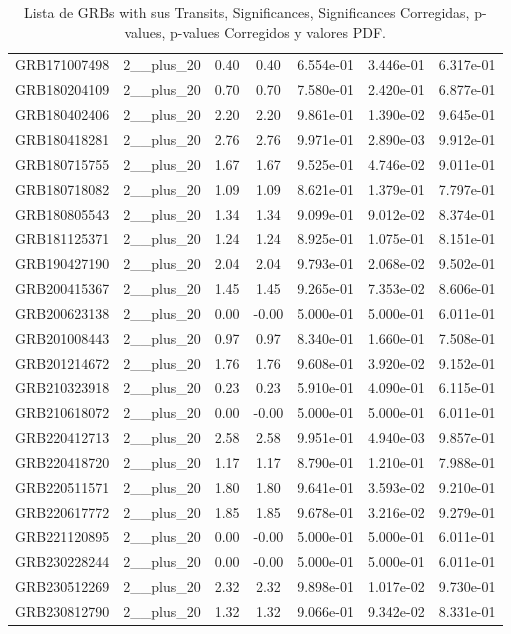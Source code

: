 \documentclass[12pt]{article}
\begin{document}
\begin{table}[h!]
{\begin{tabular}{l c c c c c c}
GRB171007498 & 2__plus_20 & 0.40 & 0.40 & 6.554e-01 & 3.446e-01 & 6.317e-01 \\
GRB180204109 & 2__plus_20 & 0.70 & 0.70 & 7.580e-01 & 2.420e-01 & 6.877e-01 \\
GRB180402406 & 2__plus_20 & 2.20 & 2.20 & 9.861e-01 & 1.390e-02 & 9.645e-01 \\
GRB180418281 & 2__plus_20 & 2.76 & 2.76 & 9.971e-01 & 2.890e-03 & 9.912e-01 \\
GRB180715755 & 2__plus_20 & 1.67 & 1.67 & 9.525e-01 & 4.746e-02 & 9.011e-01 \\
GRB180718082 & 2__plus_20 & 1.09 & 1.09 & 8.621e-01 & 1.379e-01 & 7.797e-01 \\
GRB180805543 & 2__plus_20 & 1.34 & 1.34 & 9.099e-01 & 9.012e-02 & 8.374e-01 \\
GRB181125371 & 2__plus_20 & 1.24 & 1.24 & 8.925e-01 & 1.075e-01 & 8.151e-01 \\
GRB190427190 & 2__plus_20 & 2.04 & 2.04 & 9.793e-01 & 2.068e-02 & 9.502e-01 \\
GRB200415367 & 2__plus_20 & 1.45 & 1.45 & 9.265e-01 & 7.353e-02 & 8.606e-01 \\
GRB200623138 & 2__plus_20 & 0.00 & -0.00 & 5.000e-01 & 5.000e-01 & 6.011e-01 \\
GRB201008443 & 2__plus_20 & 0.97 & 0.97 & 8.340e-01 & 1.660e-01 & 7.508e-01 \\
GRB201214672 & 2__plus_20 & 1.76 & 1.76 & 9.608e-01 & 3.920e-02 & 9.152e-01 \\
GRB210323918 & 2__plus_20 & 0.23 & 0.23 & 5.910e-01 & 4.090e-01 & 6.115e-01 \\
GRB210618072 & 2__plus_20 & 0.00 & -0.00 & 5.000e-01 & 5.000e-01 & 6.011e-01 \\
GRB220412713 & 2__plus_20 & 2.58 & 2.58 & 9.951e-01 & 4.940e-03 & 9.857e-01 \\
GRB220418720 & 2__plus_20 & 1.17 & 1.17 & 8.790e-01 & 1.210e-01 & 7.988e-01 \\
GRB220511571 & 2__plus_20 & 1.80 & 1.80 & 9.641e-01 & 3.593e-02 & 9.210e-01 \\
GRB220617772 & 2__plus_20 & 1.85 & 1.85 & 9.678e-01 & 3.216e-02 & 9.279e-01 \\
GRB221120895 & 2__plus_20 & 0.00 & -0.00 & 5.000e-01 & 5.000e-01 & 6.011e-01 \\
GRB230228244 & 2__plus_20 & 0.00 & -0.00 & 5.000e-01 & 5.000e-01 & 6.011e-01 \\
GRB230512269 & 2__plus_20 & 2.32 & 2.32 & 9.898e-01 & 1.017e-02 & 9.730e-01 \\
GRB230812790 & 2__plus_20 & 1.32 & 1.32 & 9.066e-01 & 9.342e-02 & 8.331e-01 \\
\bottomrule
\end{tabular}%
}
\caption{Lista de GRBs with sus Transits, Significances, Significances Corregidas, p-values, p-values Corregidos y valores PDF.}
\end{table}
\end{document}
